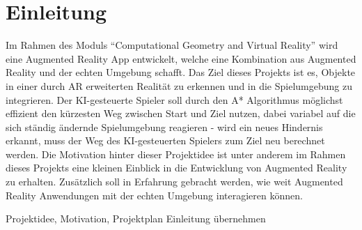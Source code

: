 \chapter{Einleitung}

Im Rahmen des Moduls “Computational Geometry and Virtual Reality” wird eine Augmented Reality App entwickelt, welche eine Kombination aus Augmented Reality und der echten Umgebung schafft. Das Ziel dieses Projekts ist es, Objekte in einer durch AR erweiterten Realit\"at zu erkennen und in die Spielumgebung zu integrieren. Der KI-gesteuerte Spieler soll durch den A* Algorithmus m\"oglichst effizient den k\"urzesten Weg zwischen Start und Ziel nutzen, dabei variabel auf die sich st\"andig \"andernde Spielumgebung reagieren - wird ein neues Hindernis erkannt, muss der Weg des KI-gesteuerten Spielers zum Ziel neu berechnet werden. 
Die Motivation hinter dieser Projektidee ist unter anderem im Rahmen dieses Projekts eine kleinen Einblick in die Entwicklung von Augmented Reality zu erhalten. Zusätzlich soll in Erfahrung gebracht werden, wie weit Augmented Reality Anwendungen mit der echten Umgebung interagieren können.

Projektidee, Motivation, Projektplan Einleitung übernehmen